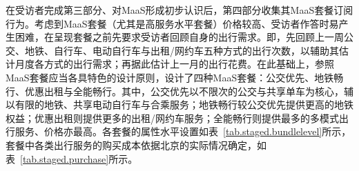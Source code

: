 在受访者完成第三部分、对MaaS形成初步认识后，第四部分收集其MaaS套餐订阅行为。考虑到MaaS套餐（尤其是高服务水平套餐）价格较高、受访者作答时易产生困难，在呈现套餐之前先要求受访者回顾自身的出行需求。即，先回顾上一周公交、地铁、自行车、电动自行车与出租/网约车五种方式的出行次数，以辅助其估计月度各方式的出行需求；再据此估计上一月的出行花费。在此基础上，参照MaaS套餐应当各具特色的设计原则\citep{hensherMobilityServicePrivate2021,matyasPotentialMobilityService2019,matyasInvestigatingHeterogeneityPreferences2021}，设计了四种MaaS套餐：公交优先、地铁畅行、优惠出租与全能畅行。其中，公交优先以不限次的公交与共享单车为核心，辅以有限的地铁、共享电动自行车与合乘服务；地铁畅行较公交优先提供更高的地铁权益；优惠出租则提供更多的出租/网约车服务；全能畅行则提供最多的多模式出行服务、价格亦最高。各套餐的属性水平设置如表~\ref{tab.staged.bundlelevel}所示，套餐中各类出行服务的购买成本依据北京的实际情况确定，如表~\ref{tab.staged.purchase}所示。


